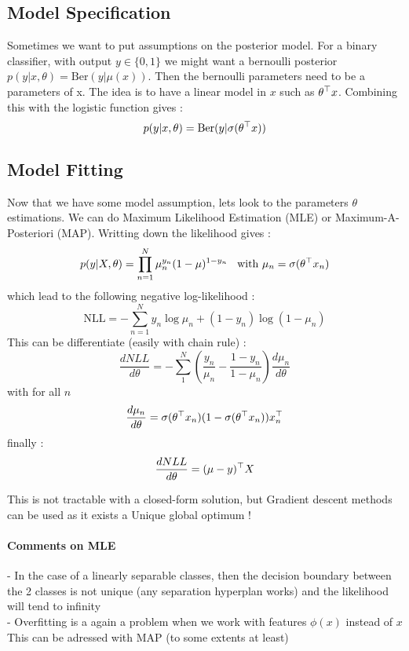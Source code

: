 		\subsection{Model Specification}

			Sometimes we want to put assumptions on the posterior model. For a binary classifier, with output $y\in \{0, 1\}$ we might want a bernoulli posterior $p(y | x, \theta) = \text{Ber}(y |\mu(x))$. Then the bernoulli parameters need to be a parameters of x. The idea is to have a linear model in $x$ such as $\theta ^\top x$. Combining this with the logistic function gives :
			\[
				p(y | x, \theta) = \text{Ber}(y | \sigma(\theta ^\top x))
			\]

		\subsection{Model Fitting}
			Now that we have some model assumption, lets look to the parameters $\theta$ estimations. We can do Maximum Likelihood Estimation (MLE) or Maximum-A-Posteriori (MAP). Writting down the likelihood gives :
			\[
				p(y | X, \theta) = \prod^N_{n=1} \mu^{y_n}_n(1-\mu)^{1-y_n} \; \; \text{ with } \mu_n = \sigma(\theta ^\top x_n)
			\]
			which lead to the following negative log-likelihood :
			\[
				\text{NLL} = -\sum^N_{n=1} y_n \log \mu_n +( 1-y_n) \log(1-\mu_n)
			\]
			This can be differentiate (easily with chain rule) :
			\[
				\frac{dNLL}{d\theta} = - \sum^N_1 (\frac{y_n}{\mu_n} - \frac{1-y_n}{1-\mu_n})\frac{d\mu_n}{d\theta} 
			\]
			with for all $n$
			\[
				\frac{d\mu_n}{d\theta}  = \sigma(\theta ^\top x_n)(1- \sigma(\theta ^\top x_n))x_n^\top
			\]
			finally : 
			\[
				\frac{dNLL}{d\theta} = (\mu - y )^\top X
			\]

			This is not tractable with a closed-form solution, but Gradient descent methods can be used as it exists a Unique global optimum !

			\paragraph*{Comments on MLE}
				- In the case of a linearly separable classes, then the decision boundary between the 2 classes is not unique (any separation hyperplan works) and the likelihood will tend to infinity\\
				- Overfitting is a again a problem when we work with features $\phi(x) $ instead of $x$\\
				This can be adressed with MAP (to some extents at least)

